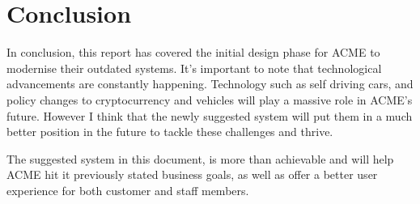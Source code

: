 \section{Conclusion}
  In conclusion, this report has covered the initial design phase for ACME to modernise their outdated systems. It's important to note that technological
  advancements are constantly happening. Technology such as self driving cars, and policy changes to cryptocurrency and vehicles will play a massive role
  in ACME's future. However I think that the newly suggested system will put them in a much better position in the future to tackle these challenges and thrive.
  
  The suggested system in this document, is more than achievable and will help ACME hit it previously stated business goals, as well as offer a better
  user experience for both customer and staff members.
\newpage